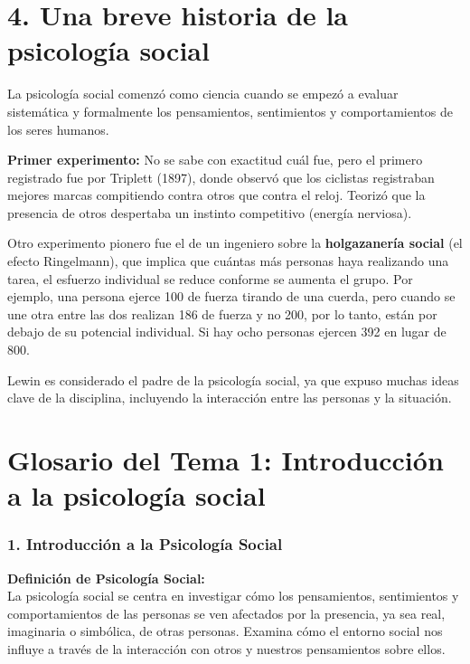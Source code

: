 \documentclass[
]{website}
\begin{document}
\section*{4. Una breve historia de la psicología social}\label{tema4}

La psicología social comenzó como ciencia cuando se empezó a evaluar sistemática y formalmente los pensamientos, sentimientos y comportamientos de los seres humanos.

\textbf{Primer experimento:} No se sabe con exactitud cuál fue, pero el primero registrado fue por Triplett (1897), donde observó que los ciclistas registraban mejores marcas compitiendo contra otros que contra el reloj. Teorizó que la presencia de otros despertaba un instinto competitivo (energía nerviosa).

Otro experimento pionero fue el de un ingeniero sobre la \textbf{holgazanería social} (el efecto Ringelmann), que implica que cuántas más personas haya realizando una tarea, el esfuerzo individual se reduce conforme se aumenta el grupo. Por ejemplo, una persona ejerce 100 de fuerza tirando de una cuerda, pero cuando se une otra entre las dos realizan 186 de fuerza y no 200, por lo tanto, están por debajo de su potencial individual. Si hay ocho personas ejercen 392 en lugar de 800.

Lewin es considerado el padre de la psicología social, ya que expuso muchas ideas clave de la disciplina, incluyendo la interacción entre las personas y la situación.

\section*{Glosario del Tema 1: Introducción a la psicología social}\label{glosario1}

\subsubsection*{1. Introducción a la Psicología Social}\label{introducciuxf3n-a-la-psicologuxeda-social}

\textbf{Definición de Psicología Social:}\\
La psicología social se centra en investigar cómo los pensamientos, sentimientos y comportamientos de las personas se ven afectados por la presencia, ya sea real, imaginaria o simbólica, de otras personas. Examina cómo el entorno social nos influye a través de la interacción con otros y nuestros pensamientos sobre ellos.
\end{document}
